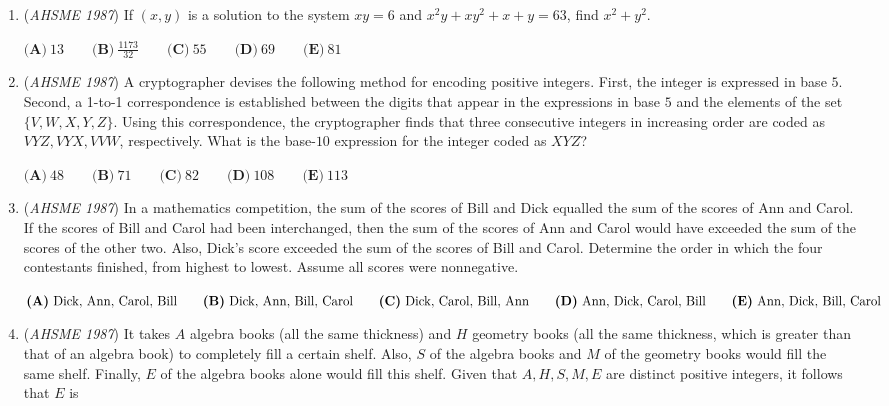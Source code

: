 \begin{enumerate}
$\textbf{(A)}\ \frac{\sqrt{5}}{5} \qquad \textbf{(B)}\ \frac{3}{5} \qquad \textbf{(C)}\ \frac{\sqrt{10}}{5} \qquad \textbf{(D)}\ \frac{4}{5}\qquad \textbf{(E)}\ \text{none of these}$


	\item (\textit{AHSME 1987}) If $(x, y)$ is a solution to the system
$xy=6$ and $x^2y+xy^2+x+y=63$,
find $x^2+y^2$.


 $\textbf{(A)}\ 13 \qquad \textbf{(B)}\ \frac{1173}{32} \qquad \textbf{(C)}\ 55 \qquad \textbf{(D)}\ 69 \qquad \textbf{(E)}\ 81$


	\item (\textit{AHSME 1987}) A cryptographer devises the following method for encoding positive integers. First, the integer is expressed in base $5$. 
Second, a 1-to-1 correspondence is established between the digits that appear in the expressions in base $5$ and the elements of the set 
$\{V, W, X, Y, Z\}$. Using this correspondence, the cryptographer finds that three consecutive integers in increasing 
order are coded as $VYZ, VYX, VVW$, respectively. What is the base-$10$ expression for the integer coded as $XYZ$?


 $\textbf{(A)}\ 48 \qquad \textbf{(B)}\ 71 \qquad \textbf{(C)}\ 82 \qquad \textbf{(D)}\ 108 \qquad \textbf{(E)}\ 113$


	\item (\textit{AHSME 1987}) In a mathematics competition, the sum of the scores of Bill and Dick equalled the sum of the scores of Ann and Carol. 
If the scores of Bill and Carol had been interchanged, then the sum of the scores of Ann and Carol would have exceeded 
the sum of the scores of the other two. Also, Dick's score exceeded the sum of the scores of Bill and Carol. 
Determine the order in which the four contestants finished, from highest to lowest. Assume all scores were nonnegative.


 $\textbf{(A)}\ \text{Dick, Ann, Carol, Bill} \qquad \textbf{(B)}\ \text{Dick, Ann, Bill, Carol} \qquad \textbf{(C)}\ \text{Dick, Carol, Bill, Ann}\\ \qquad \textbf{(D)}\ \text{Ann, Dick, Carol, Bill}\qquad \textbf{(E)}\ \text{Ann, Dick, Bill, Carol}$


	\item (\textit{AHSME 1987}) It takes $A$ algebra books (all the same thickness) and $H$ geometry books (all the same thickness, 
which is greater than that of an algebra book) to completely fill a certain shelf. 
Also, $S$ of the algebra books and $M$ of the geometry books would fill the same shelf. 
Finally, $E$ of the algebra books alone would fill this shelf. Given that $A, H, S, M, E$ are distinct positive integers, 
it follows that $E$ is



\end{enumerate}
